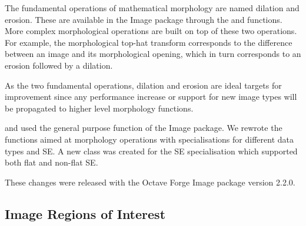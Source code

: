 The fundamental operations of mathematical morphology are named dilation and
erosion.  These are available in the Image package through the
 and  functions.  More complex
morphological operations are built on top of these two operations.  For
example, the morphological top-hat transform corresponds to the difference
between an image and its morphological opening, which in turn
corresponds to an erosion followed by a dilation.

As the two fundamental operations, dilation and erosion are ideal targets for
improvement since any performance increase or
support for new image types will be propagated to
higher level morphology functions.


 and  used the general purpose
 function of the Image package.
We rewrote the functions aimed at morphology operations with
specialisations for different data types and SE.
A new  class was created for the SE specialisation which
supported both flat and non-flat SE.

These changes were released with
the Octave Forge Image package version 2.2.0.


\subsection{Image Regions of Interest}

